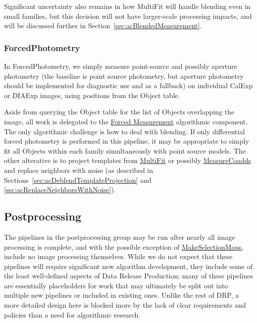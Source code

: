 Significant uncertainty also remains in how MultiFit will handle blending even in small families, but this decision will not have larger-scale processing impacts, and will be discussed further in Section~\ref{sec:acBlendedMeasurement}.

\subsubsection{ForcedPhotometry}
\label{sec:drpForcedPhotometry}

In ForcedPhotometry, we simply measure point-source and possibly aperture photometry (the baseline is point source photometry, but aperture photometry should be implemented for diagnostic use and as a fallback) on individual CalExp or DIAExp images, using positions from the Object table.

Aside from querying the Object table for the list of Objects overlapping the image, all work is delegated to the \hyperref[sec:acForcedMeasurement]{Forced Measurement} algorithmic component.  The only algorithmic challenge is how to deal with blending.  If only differential forced photometry is performed in this pipeline, it may be appropriate to simply fit all Objects within each family simultaneously with point source models.  The other alterative is to project templates from \hyperref[sec:drpMultiFit]{MultiFit} or possibly \hyperref[sec:drpMeasureCoadds]{MeasureCoadds} and replace neighbors with noise (as described in Sections~\ref{sec:acDeblendTemplateProjection} and \ref{sec:acReplaceNeighborsWithNoise}).

\subsection{Postprocessing}
\label{sec:drp_postprocessing}

The pipelines in the postprocessing group may be run after nearly all image processing is complete, and with the possible exception of \hyperref[sec:drpMakeSelectionMaps]{MakeSelectionMaps}, include no image processing themselves.  While we do not expect that these pipelines will require significant new algorithm development, they include some of the least well-defined aspects of Data Release Production; many of these pipelines are essentially placeholders for work that may ultimately be split out into multiple new pipelines or included in existing ones.  Unlike the rest of DRP, a more detailed design here is blocked more by the lack of clear requirements and policies than a need for algorithmic research.

